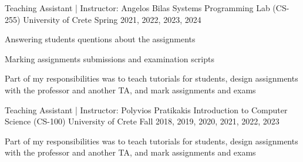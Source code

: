 


\begin{cventries}

  \cventry
    {Teaching Assistant | Instructor: Angelos Bilas} %
    {Systems Programming Lab (CS-255)} %
    {University of Crete} %
    {Spring 2021, 2022, 2023, 2024} %
    {
      \begin{cvitems} %
        \item{Answering students quentions about the assignments}
        \item{Marking assignments submissions and examination scripts}
        \item{Part of my responsibilities was to teach tutorials for
            students, design assignments with the professor and
              another TA, and mark assignments and exams}
      \end{cvitems}
    }

  \cventry
    {Teaching Assistant | Instructor: Polyvios Pratikakis} %
    {Introduction to Computer Science (CS-100)} %
    {University of Crete} %
    {Fall 2018, 2019, 2020, 2021, 2022, 2023} %
    {
      \begin{cvitems} %
        \item{Part of my responsibilities was to teach tutorials for
            students, design assignments with the professor and
              another TA, and mark assignments and exams}
      \end{cvitems}
    }


\end{cventries}

